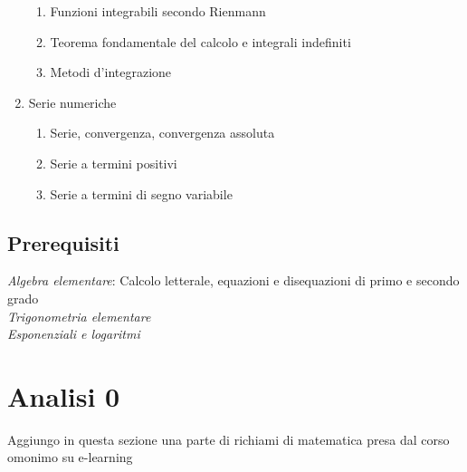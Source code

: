 \documentclass[12pt, a4paper, openany]{book}
\begin{document}
\begin{enumerate}
\begin{enumerate}
    \item Funzioni integrabili secondo Rienmann
    \item Teorema fondamentale del calcolo e integrali indefiniti
    \item Metodi d'integrazione
\end{enumerate}
\item Serie numeriche
\begin{enumerate}
    \item Serie, convergenza, convergenza assoluta
    \item Serie a termini positivi
    \item Serie a termini di segno variabile
\end{enumerate}
\end{enumerate}

\section{Prerequisiti}
\emph{Algebra elementare}: Calcolo letterale, equazioni e disequazioni di primo e secondo grado
\\\emph{Trigonometria elementare}
\\\emph{Esponenziali e logaritmi}

\chapter{Analisi 0}
Aggiungo in questa sezione una parte di richiami di matematica presa dal corso omonimo su e-learning
\end{document}
